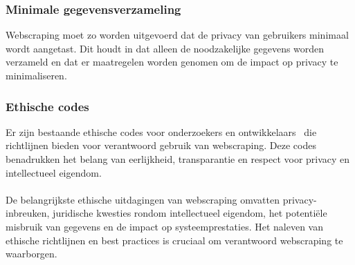 \subsubsection{Minimale gegevensverzameling}
Webscraping moet zo worden uitgevoerd dat de privacy van gebruikers minimaal wordt aangetast. Dit houdt in dat alleen de noodzakelijke gegevens worden verzameld en dat er maatregelen worden genomen om de impact op privacy te minimaliseren.

\subsubsection{Ethische codes}
Er zijn bestaande ethische codes voor onderzoekers en ontwikkelaars~\autocite{Don2018} die richtlijnen bieden voor verantwoord gebruik van webscraping. Deze codes benadrukken het belang van eerlijkheid, transparantie en respect voor privacy en intellectueel eigendom.
\\
\\
De belangrijkste ethische uitdagingen van webscraping omvatten privacy-inbreuken, juridische kwesties rondom intellectueel eigendom, het potentiële misbruik van gegevens en de impact op systeemprestaties. Het naleven van ethische richtlijnen en best practices is cruciaal om verantwoord webscraping te waarborgen.